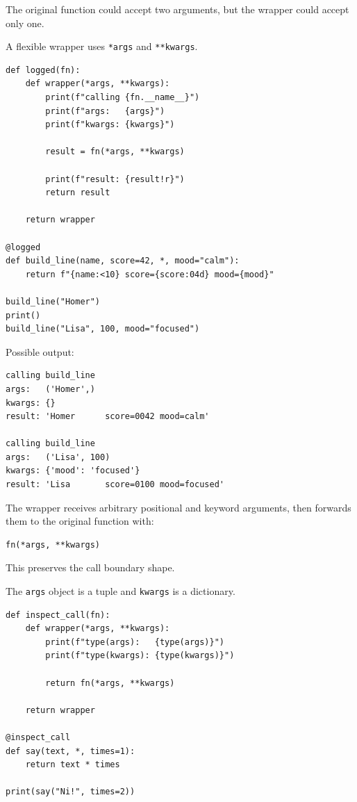 The original function could accept two arguments, but the wrapper could accept only one.

A flexible wrapper uses \texttt{*args} and \texttt{**kwargs}.

\begin{verbatim}
def logged(fn):
    def wrapper(*args, **kwargs):
        print(f"calling {fn.__name__}")
        print(f"args:   {args}")
        print(f"kwargs: {kwargs}")

        result = fn(*args, **kwargs)

        print(f"result: {result!r}")
        return result

    return wrapper

@logged
def build_line(name, score=42, *, mood="calm"):
    return f"{name:<10} score={score:04d} mood={mood}"

build_line("Homer")
print()
build_line("Lisa", 100, mood="focused")
\end{verbatim}

Possible output:

\begin{verbatim}
calling build_line
args:   ('Homer',)
kwargs: {}
result: 'Homer      score=0042 mood=calm'

calling build_line
args:   ('Lisa', 100)
kwargs: {'mood': 'focused'}
result: 'Lisa       score=0100 mood=focused'
\end{verbatim}

The wrapper receives arbitrary positional and keyword arguments, then forwards them to the original function with:

\begin{verbatim}
fn(*args, **kwargs)
\end{verbatim}

This preserves the call boundary shape.

The \texttt{args} object is a tuple and \texttt{kwargs} is a dictionary.

\begin{verbatim}
def inspect_call(fn):
    def wrapper(*args, **kwargs):
        print(f"type(args):   {type(args)}")
        print(f"type(kwargs): {type(kwargs)}")

        return fn(*args, **kwargs)

    return wrapper

@inspect_call
def say(text, *, times=1):
    return text * times

print(say("Ni!", times=2))
\end{verbatim}

